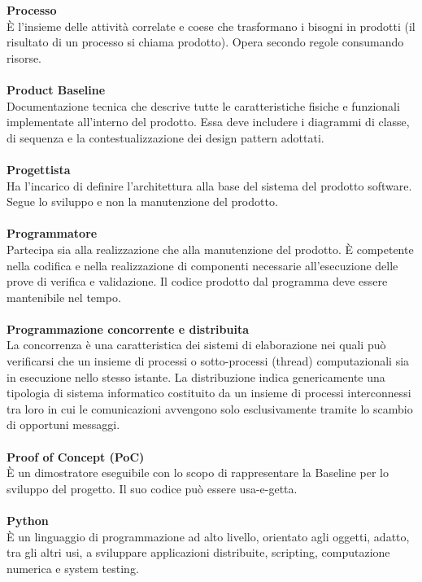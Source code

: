 \textbf{Processo}\\ 
È l'insieme delle attività correlate e coese che trasformano i bisogni in prodotti (il risultato di un processo si chiama prodotto). Opera secondo regole consumando risorse. \\ \\
\textbf{Product Baseline}\\ 
Documentazione tecnica che descrive tutte le caratteristiche fisiche e funzionali implementate all'interno del prodotto. Essa deve includere i diagrammi di classe, di sequenza e la contestualizzazione dei design pattern adottati. \\ \\
\textbf{Progettista}\\ 
Ha l'incarico di definire l'architettura alla base del sistema del prodotto software. Segue lo sviluppo e non la manutenzione del prodotto. \\ \\
\textbf{Programmatore}\\ 
Partecipa sia alla realizzazione che alla manutenzione del prodotto. È competente nella codifica e nella realizzazione di componenti necessarie all'esecuzione delle prove di verifica e validazione. Il codice prodotto dal programma deve essere mantenibile nel tempo.\\ \\
\textbf{Programmazione concorrente e distribuita}\\
La concorrenza è una caratteristica dei sistemi di elaborazione nei quali può verificarsi che un insieme di processi o sotto-processi (thread) computazionali sia in esecuzione nello stesso istante. La distribuzione indica genericamente una tipologia di sistema informatico costituito da un insieme di processi interconnessi tra loro in cui le comunicazioni avvengono solo esclusivamente tramite lo scambio di opportuni messaggi. \\ \\
\textbf{Proof of Concept (PoC)}\\
È un dimostratore eseguibile con lo scopo di rappresentare la Baseline per lo sviluppo del progetto. Il suo codice può essere usa-e-getta. \\ \\  %
\textbf{Python}\\
È un linguaggio di programmazione ad alto livello, orientato agli oggetti, adatto, tra gli altri usi, a sviluppare applicazioni distribuite, scripting, computazione numerica e system testing. \\ \\
\clearpage